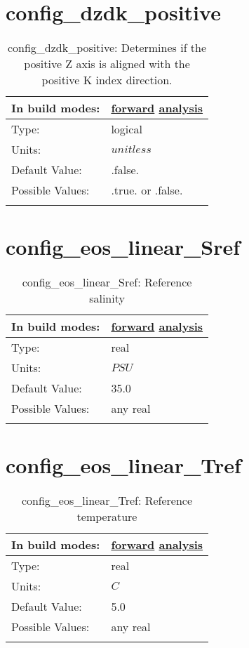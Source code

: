 \section[config\_dzdk\_positive]{config\_dzdk\_positive}
\label{sec:nm_sec_config_dzdk_positive}
\begin{center}
\begin{longtable}{| p{2.0in} || p{4.0in} |}
    \hline
    In build modes: & \hyperref[subsec:forward_nm_tab_ALE_vertical_grid]{forward} \hyperref[subsec:analysis_nm_tab_ALE_vertical_grid]{analysis} \\
    \hline
    Type: & logical \\
    \hline
    Units: & $unitless$ \\
    \hline
    Default Value: & .false. \\
    \hline
    Possible Values: & .true. or .false. \\
    \hline
    \caption{config\_dzdk\_positive: Determines if the positive Z axis is aligned with the positive K index direction.}
\end{longtable}
\end{center}
\section[config\_eos\_linear\_Sref]{config\_eos\_linear\_Sref}
\label{sec:nm_sec_config_eos_linear_Sref}
\begin{center}
\begin{longtable}{| p{2.0in} || p{4.0in} |}
    \hline
    In build modes: & \hyperref[subsec:forward_nm_tab_eos_linear]{forward} \hyperref[subsec:analysis_nm_tab_eos_linear]{analysis} \\
    \hline
    Type: & real \\
    \hline
    Units: & $PSU$ \\
    \hline
    Default Value: & 35.0 \\
    \hline
    Possible Values: & any real \\
    \hline
    \caption{config\_eos\_linear\_Sref: Reference salinity}
\end{longtable}
\end{center}
\section[config\_eos\_linear\_Tref]{config\_eos\_linear\_Tref}
\label{sec:nm_sec_config_eos_linear_Tref}
\begin{center}
\begin{longtable}{| p{2.0in} || p{4.0in} |}
    \hline
    In build modes: & \hyperref[subsec:forward_nm_tab_eos_linear]{forward} \hyperref[subsec:analysis_nm_tab_eos_linear]{analysis} \\
    \hline
    Type: & real \\
    \hline
    Units: & $C$ \\
    \hline
    Default Value: & 5.0 \\
    \hline
    Possible Values: & any real \\
    \hline
    \caption{config\_eos\_linear\_Tref: Reference temperature}
\end{longtable}
\end{center}

